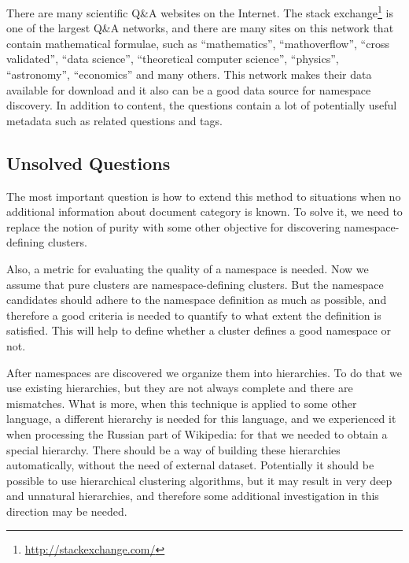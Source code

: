 There are many scientific Q\&A websites on the Internet. The stack
exchange\footnote{\url{http://stackexchange.com/}} is one of the largest Q\&A networks,
and there are many sites on this network that contain mathematical formulae, such as
``mathematics'', ``mathoverflow'', ``cross validated'', ``data science'',
``theoretical computer science'', ``physics'', ``astronomy'', ``economics'' and many others.
This network makes their data available for download and it also can be a good
data source for namespace discovery. In addition to content, the questions contain
a lot of potentially useful metadata such as related questions and tags.


\subsection{Unsolved Questions} %

The most important question is how to extend this method to situations when
no additional information about document category is known. To solve
it, we need to replace the notion of purity with some other objective
for discovering namespace-defining clusters.

Also, a metric for evaluating the quality of a namespace is needed.
Now we assume that pure clusters are namespace-defining clusters. But the namespace
candidates should adhere to the namespace definition as much as possible,
and therefore a good criteria is needed to quantify to what extent the definition
is satisfied. This will help to define whether a cluster defines a good namespace
or not.

After namespaces are discovered we organize them into hierarchies.
To do that we use existing hierarchies, but they are not always complete
and there are mismatches. What is more, when this technique is applied to some
other language, a different hierarchy is needed for this language, and we experienced
it when processing the Russian part of Wikipedia: for that we needed to obtain
a special hierarchy. There should be a way of building these hierarchies
automatically, without the need of external dataset.
Potentially it should be possible to use hierarchical clustering
algorithms, but it may result in very deep and unnatural hierarchies, and
therefore some additional investigation in this direction may be needed.
